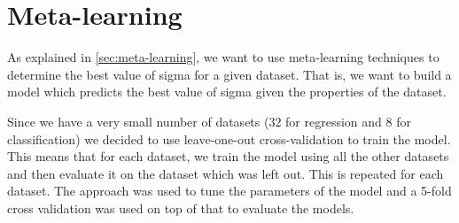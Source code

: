%
%
%

\pagebreak
\section{Meta-learning}

As explained in \cref{sec:meta-learning}, we want to use meta-learning
techniques to determine the best value of sigma for a given dataset. That
is, we want to build a model which predicts the best value of sigma given
the properties of the dataset.

Since we have a very small number of datasets (32 for regression and 8 for classification)
we decided to use leave-one-out cross-validation to train the model. This
means that for each dataset, we train the model using all the other datasets
and then evaluate it on the dataset which was left out. This is repeated
for each dataset. The approach was used to tune the parameters of the model
and a 5-fold cross validation was used on top of that to evaluate the models.


